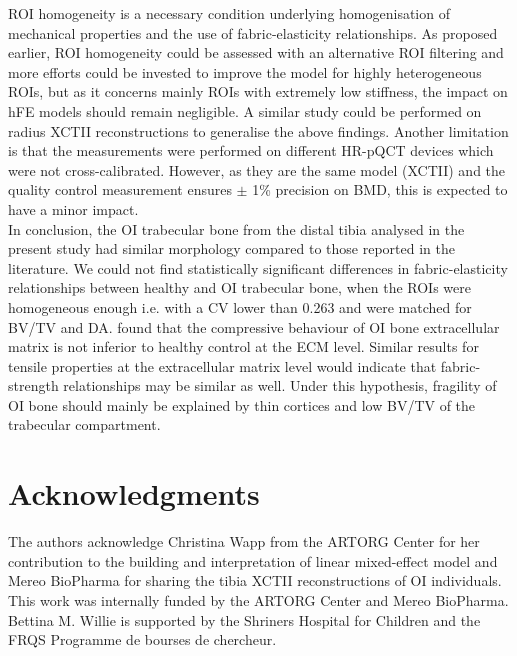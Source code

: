 \documentclass[a4paper,fleqn]{DC_ArtStyle}
\begin{document}
ROI homogeneity is a necessary condition underlying homogenisation of mechanical properties and the use of fabric-elasticity relationships. %
As proposed earlier, ROI homogeneity could be assessed with an alternative ROI filtering and more efforts could be invested to improve the model for highly heterogeneous ROIs, but as it concerns mainly ROIs with extremely low stiffness, the impact on hFE models should remain negligible.
A similar study could be performed on radius XCTII reconstructions to generalise the above findings. Another limitation is that the measurements were performed on different HR-pQCT devices which were not cross-calibrated. However, as they are the same model (XCTII) and the quality control measurement ensures $\pm$ 1\% precision on BMD, this is expected to have a minor impact. \\

In conclusion, the OI trabecular bone from the distal tibia analysed in the present study had similar morphology compared to those reported in the literature. We could not find statistically significant differences in fabric-elasticity relationships between healthy and OI trabecular bone, when the ROIs were homogeneous enough i.e. with a CV lower than 0.263 and were matched for BV/TV and DA.
\citeauthor{Indermaur2021} \cite{Indermaur2021} found that the compressive behaviour of OI bone extracellular matrix is not inferior to healthy control at the ECM level. Similar results for tensile properties at the extracellular matrix level would indicate that fabric-strength relationships may be similar as well. Under this hypothesis, fragility of OI bone should mainly be explained by thin cortices and low BV/TV of the trabecular compartment.

%
%
%
%
%
%

\section*{Acknowledgments}
The authors acknowledge Christina Wapp from the ARTORG Center for her contribution to the building and interpretation of linear mixed-effect model and Mereo BioPharma for sharing the tibia XCTII reconstructions of OI individuals. This work was internally funded by the ARTORG Center and Mereo BioPharma.  Bettina M. Willie is supported by the Shriners Hospital for Children and the FRQS Programme de bourses de chercheur. 

\appendix
\end{document}
